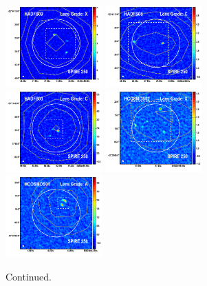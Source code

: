 \documentclass[iop]{emulateapj}
\begin{document}
\begin{figure}[!tbp] 
    \begin{centering}
\includegraphics[width=0.331\textwidth]{HADFS09_870_250.pdf}
\includegraphics[width=0.331\textwidth]{HADFS08_870_250.pdf}
\includegraphics[width=0.331\textwidth]{HADFS03_870_250.pdf}
\includegraphics[width=0.331\textwidth]{HCOSMOS02_870_250.pdf}
\includegraphics[width=0.331\textwidth]{HCOSMOS01_870_250.pdf}
\end{centering}

\caption{ Continued.}

\end{figure}
\end{document}
